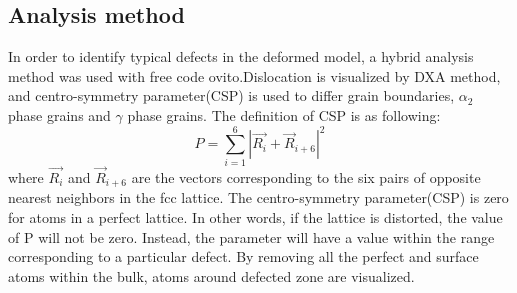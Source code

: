 \documentclass[materials,article,submit,moreauthors,pdftex,10pt,a4paper]{Definitions/mdpi}
\begin{document}
\subsection{Analysis method}
In order to identify typical defects in the deformed model, a hybrid analysis method was used with free code ovito\cite{Stukowski2010}.Dislocation is visualized by DXA method, and centro-symmetry parameter(CSP) is used to differ grain boundaries, $\alpha_2$ phase grains and $\gamma$ phase grains. The definition of CSP is as following:
	\begin{equation} \label{eq:csp} 
	P = \displaystyle\sum_{i=1}^{6}|\vec{R_i}+{\vec{R}}_{i+6}|^2
	\end{equation}
where $\vec{R_i}$ and ${\vec{R}}_{i+6}$ are the vectors corresponding to the six pairs of opposite nearest neighbors in the fcc lattice. The centro-symmetry parameter(CSP) is zero for atoms in a perfect lattice. In other words, if the lattice is distorted, the value of P will not be zero. Instead, the parameter will have a value within the range corresponding to a particular defect. By removing all the perfect and surface atoms within the bulk, atoms around defected zone are visualized. 
\end{document}
